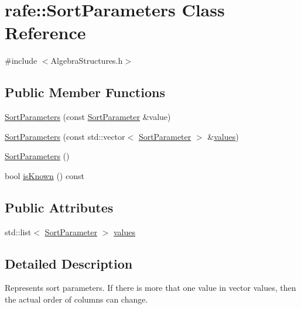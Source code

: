 \hypertarget{classrafe_1_1_sort_parameters}{\section{rafe\+:\+:Sort\+Parameters Class Reference}
\label{classrafe_1_1_sort_parameters}
}


{\ttfamily \#include $<$Algebra\+Structures.\+h$>$}

\subsection*{Public Member Functions}
\begin{DoxyCompactItemize}
\item 
\hyperlink{classrafe_1_1_sort_parameters_a97ba47d4fcbfa7280139cc9039392ed8}{Sort\+Parameters} (const \hyperlink{classrafe_1_1_sort_parameter}{Sort\+Parameter} \&value)
\item 
\hyperlink{classrafe_1_1_sort_parameters_aaa89f029adf5573f3334015b03d6d93d}{Sort\+Parameters} (const std\+::vector$<$ \hyperlink{classrafe_1_1_sort_parameter}{Sort\+Parameter} $>$ \&\hyperlink{classrafe_1_1_sort_parameters_a702fc8395a31ce5f4f83fb960cd0de44}{values})
\item 
\hyperlink{classrafe_1_1_sort_parameters_ae31a9cda44dc60f631c3cac9e2ed2610}{Sort\+Parameters} ()
\item 
bool \hyperlink{classrafe_1_1_sort_parameters_aeaa22b9a988f59b71c52dc01b09601e0}{is\+Known} () const 
\end{DoxyCompactItemize}
\subsection*{Public Attributes}
\begin{DoxyCompactItemize}
\item 
std\+::list$<$ \hyperlink{classrafe_1_1_sort_parameter}{Sort\+Parameter} $>$ \hyperlink{classrafe_1_1_sort_parameters_a702fc8395a31ce5f4f83fb960cd0de44}{values}
\end{DoxyCompactItemize}


\subsection{Detailed Description}
Represents sort parameters. If there is more that one value in vector values, then the actual order of columns can change. 

